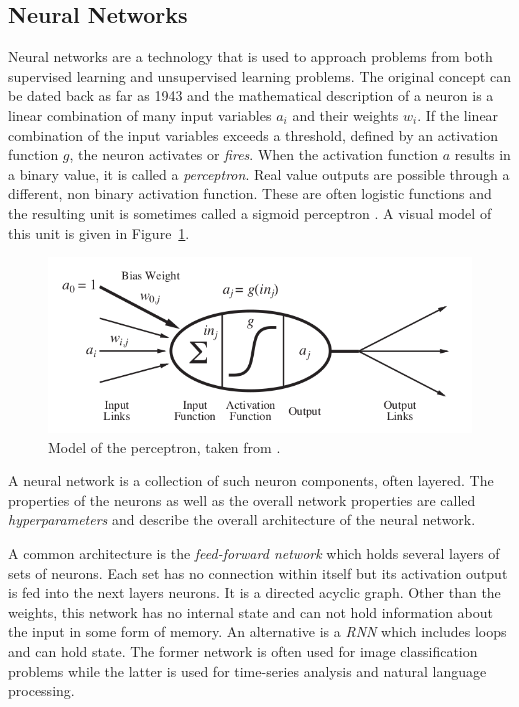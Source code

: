 \subsection{Neural Networks}%
\label{sec:neural_networks}



Neural networks are a technology that is used to approach problems from both supervised learning and unsupervised learning problems. The original
concept can be dated back as far as 1943 \cite[p.727]{russell2016artificial} and the mathematical description of a
neuron is a linear combination of many input variables $a_i$ and their weights $w_i$. If the linear combination of the
input variables exceeds a threshold, defined by an activation function $g$, the neuron activates or \emph{fires}. When
the activation function $a$ results in a binary value, it is called a \emph{perceptron}. Real value outputs are possible
through a different, non binary activation function. These are often logistic functions and the resulting unit is
sometimes called a sigmoid perceptron \cite[p.729]{russell2016artificial}. A visual model of this unit
is given in Figure~\ref{fig:perceptron}.

\begin{figure}[]
    \centering
    \includegraphics[width=0.8\linewidth]{img/perceptron.png}
    \caption{Model of the perceptron, taken from \cite[]{russell2016artificial}.}
    \label{fig:perceptron}
\end{figure}

A neural network  is a collection of such neuron components, often layered. The properties of the neurons as well
as the overall network properties are called \emph{hyperparameters} and describe the overall architecture of the neural network.

A common architecture is the \emph{feed-forward network} which holds several layers of sets of neurons. Each set has no
connection within itself but its activation output is fed into the next layers neurons. It is a directed
acyclic graph. Other than the weights, this network has no internal state and can not hold information about
the input in some form of memory. An alternative is a \emph{\acl {RNN} } which includes loops and can
hold state. The former network is often used for image classification problems while the latter is used for
time-series analysis and natural language processing.

